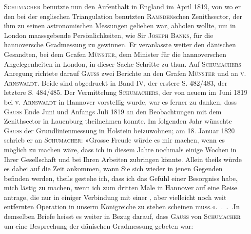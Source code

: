 \par\noindent\hspace*{\parindent}\textsc{Schumacher} benutzte nun den Aufenthalt in England im April 1819, von wo er den bei der englischen Triangulation benutzten \textsc{Ramsden}schen Zenithsector, der ihm zu seinen astronomischen Messungen geliehen war, abholen wollte, um in London maassgebende Persönlichkeiten, wie Sir \textsc{Joseph Banks}, für die hannoversche Gradmessung zu gewinnen. Er veranlasste weiter den dänischen Gesandten, bei dem Grafen \textsc{Münster}, dem Minister für die hannoverschen Angelegenheiten in London, in dieser Sache Schritte zu thun. Auf \textsc{Schumachers} Anregung richtete darauf \textsc{Gauss} zwei Berichte an den Grafen \textsc{Münster} und an \textsc{v. Arnswaldt}. Beide sind abgedruckt in Band IV, der erstere S. 482/483, der letztere S. 484/485. Der Vermittelung \textsc{Schumachers}, der von neuem im Juni 1819 bei \textsc{v. Arnswaldt} in Hannover vorstellig wurde, war es ferner zu danken, dass \textsc{Gauss} Ende Juni und Anfangs Juli 1819 an den Beobachtungen mit dem Zenithsector in Lauenburg theilnehmen konnte. Im folgenden Jahr wünschte \textsc{Gauss} der Grundlinienmessung in Holstein beizuwohnen; am 18. Januar 1820 schrieb er an \textsc{Schumacher}: »Grosse Freude würde es mir machen, wenn es möglich zu machen wäre, dass ich in diesem Jahre nochmals einige Wochen in Ihrer Gesellschaft und bei Ihren Arbeiten zubringen könnte. Allein theils würde es dabei auf die Zeit ankommen, wann Sie sich wieder in jenen Gegenden befinden werden, theils gestehe ich, dass ich das Gefühl einer Besorgniss habe, mich lästig zu machen, wenn ich zum dritten Male in Hannover auf eine Reise antrage, die nur in einiger Verbindung mit einer , aber vielleicht noch weit entfernten Operation in unserm Königreiche zu stehen scheinen muss.«\enspace .\ .\ .\ .\enspace In demselben Briefe heisst es weiter in Bezug darauf, dass \textsc{Gauss} von \textsc{Schumacher} um eine Besprechung der dänischen Gradmessung gebeten war:

